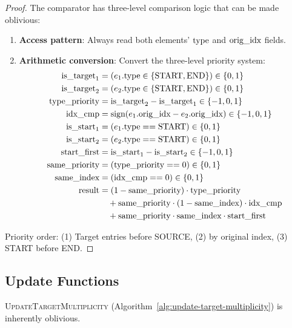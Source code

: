 \begin{proof}
The comparator has three-level comparison logic that can be made oblivious:
\begin{enumerate}
\item \textbf{Access pattern}: Always read both elements' $\text{type}$ and $\text{orig\_idx}$ fields.
\item \textbf{Arithmetic conversion}: Convert the three-level priority system:
\begin{align}
\text{is\_target}_1 &= (e_1.\text{type} \in \{\text{START}, \text{END}\}) \in \{0,1\} \nonumber \\
\text{is\_target}_2 &= (e_2.\text{type} \in \{\text{START}, \text{END}\}) \in \{0,1\} \nonumber \\
\text{type\_priority} &= \text{is\_target}_2 - \text{is\_target}_1 \in \{-1, 0, 1\} \nonumber \\
\text{idx\_cmp} &= \text{sign}(e_1.\text{orig\_idx} - e_2.\text{orig\_idx}) \in \{-1, 0, 1\} \nonumber \\
\text{is\_start}_1 &= (e_1.\text{type} == \text{START}) \in \{0,1\} \nonumber \\
\text{is\_start}_2 &= (e_2.\text{type} == \text{START}) \in \{0,1\} \nonumber \\
\text{start\_first} &= \text{is\_start}_1 - \text{is\_start}_2 \in \{-1, 0, 1\} \nonumber \\
\text{same\_priority} &= (\text{type\_priority} == 0) \in \{0,1\} \nonumber \\
\text{same\_index} &= (\text{idx\_cmp} == 0) \in \{0,1\} \nonumber \\
\text{result} &= (1 - \text{same\_priority}) \cdot \text{type\_priority} \nonumber \\
&\quad + \text{same\_priority} \cdot (1 - \text{same\_index}) \cdot \text{idx\_cmp} \nonumber \\
&\quad + \text{same\_priority} \cdot \text{same\_index} \cdot \text{start\_first} \nonumber
\end{align}
\end{enumerate}
Priority order: (1) Target entries before SOURCE, (2) by original index, (3) START before END.
\end{proof}

\subsection{Update Functions}

\begin{lemma}
\label{lem:update-target-mult}
\textsc{UpdateTargetMultiplicity} (Algorithm~\ref{alg:update-target-multiplicity}) is inherently oblivious.
\end{lemma}

